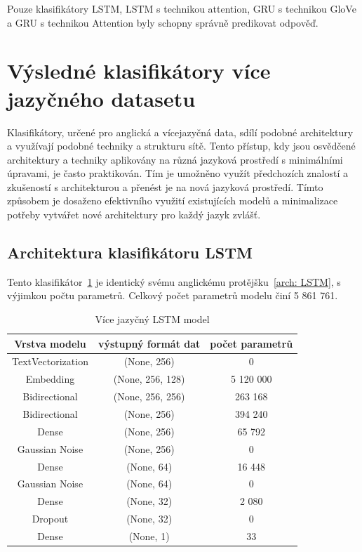 Pouze klasifikátory LSTM, LSTM s technikou attention, GRU s technikou GloVe a GRU s technikou Attention byly schopny správně predikovat odpověď.

\section{Výsledné klasifikátory více jazyčného datasetu}
Klasifikátory, určené pro anglická a vícejazyčná data, sdílí podobné architektury a využívají podobné techniky a strukturu sítě.
Tento přístup, kdy jsou osvědčené architektury a techniky aplikovány na různá jazyková prostředí s minimálními úpravami, je často praktikován.
Tím je umožněno využít předchozích znalostí a zkušeností s architekturou a přenést je na nová jazyková prostředí.
Tímto způsobem je dosaženo efektivního využití existujících modelů a minimalizace potřeby vytvářet nové architektury pro každý jazyk zvlášť.

\subsection{Architektura klasifikátoru LSTM}
Tento klasifikátor~\ref{tab:MULTI LSTM model} je identický svému anglickému protějšku~\ref{arch: LSTM}, s výjimkou počtu parametrů.
Celkový počet parametrů modelu činí 5 861 761.

\begin{table}[H]
	\centering
	\caption{Více jazyčný LSTM model}\label{tab:MULTI LSTM model}
	\begin{tabular}{ c c c }
			\toprule
			Vrstva modelu & výstupný formát dat & počet parametrů\\
			\midrule
            TextVectorization & (None, 256) & 0\\         
            Embedding & (None, 256, 128) & 5 120 000\\   
            Bidirectional & (None, 256, 256) & 263 168\\    
            Bidirectional & (None, 256) & 394 240\\
			Dense & (None, 256) & 65 792\\ 
			Gaussian Noise & (None, 256) & 0\\
            Dense & (None, 64) & 16 448\\ 
			Gaussian Noise & (None, 64) & 0\\
			Dense & (None, 32) & 2 080\\ 
            Dropout & (None, 32) & 0\\   
            Dense & (None, 1) & 33\\ 
			\midrule
		\end{tabular}
\end{table}

